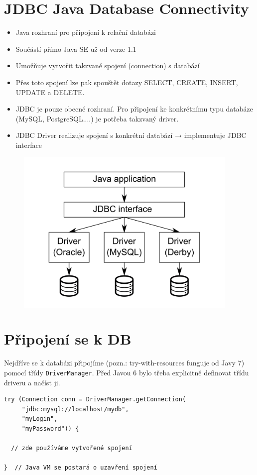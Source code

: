 \documentclass{szzclass}
\begin{document}
\section{JDBC Java Database Connectivity}
\begin{itemize}
\item Java rozhraní pro připojení k relační databázi
\item Součástí přímo Java SE už od verze 1.1
\item Umožňuje vytvořit takzvané spojení (connection) s databází
\item Přes toto spojení lze pak spouštět dotazy SELECT, CREATE, INSERT, UPDATE a DELETE.
\item JDBC je pouze obecné rozhraní. Pro připojení ke konkrétnímu typu databáze (MySQL, PostgreSQL....) je potřeba takzvaný driver.
\item JDBC Driver realizuje spojení s konkrétní databází → implementuje JDBC interface
\end{itemize}
\begin{figure}[h!]
\includegraphics[width=0.95\textwidth]{topics/bi-wsi-si-28/images/image1.png}
\end{figure}

\section{Připojení se k DB}
Nejdříve se k databázi připojíme (pozn.: try-with-resources funguje od Javy 7) pomocí třídy \texttt{DriverManager}. Před Javou 6 bylo třeba explicitně definovat třídu driveru a načíst ji.

\begin{verbatim}
try (Connection conn = DriverManager.getConnection(
     "jdbc:mysql://localhost/mydb",
     "myLogin",
     "myPassword")) {

  // zde používáme vytvořené spojení

}  // Java VM se postará o uzavření spojení
\end{verbatim}
\end{document}
